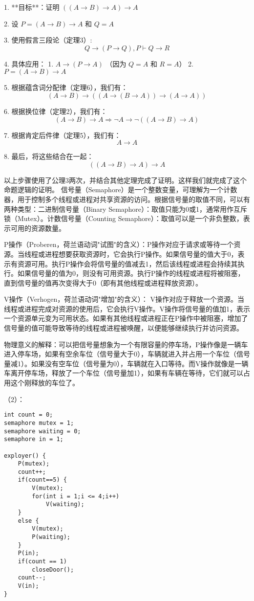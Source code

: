 \documentclass{article}
\begin{document}
1. **目标**：证明 \(((A \to B) \to A) \to A\)

2. 设 \(P = (A \to B) \to A\) 和 \(Q = A\)

3. 使用假言三段论（定理3）:
\[
Q \to (P \to Q), P \vdash Q \to R
\]

4. 具体应用：
1. \(A \to (P \to A)\) （因为 \(Q = A\) 和 \(R = A\)）
2. \(P = (A \to B) \to A\)

5. 根据蕴含词分配律（定理6），我们有：
\[
(A \to B) \to ((A \to (B \to A)) \to (A \to A))
\]

6. 根据换位律（定理2），我们有：
\[
(A \to B) \to A \Rightarrow \neg A \to \neg ((A \to B) \to A)
\]

7. 根据肯定后件律（定理5），我们有：
\[
A \to A
\]

8. 最后，将这些结合在一起：
\[
((A \to B) \to A) \to A
\]

以上步骤使用了公理3两次，并结合其他定理完成了证明。这样我们就完成了这个命题逻辑的证明。
信号量（Semaphore）是一个整数变量，可理解为一个计数器，用于控制多个线程或进程对共享资源的访问。根据信号量的取值不同，可以有两种类型：二进制信号量（Binary Semaphore）：取值只能为0或1，通常用作互斥锁（Mutex）。计数信号量（Counting Semaphore）：取值可以是一个非负整数，表示可用的资源数量。

P操作（Proberen，荷兰语动词"试图"的含义）：P操作对应于请求或等待一个资源。当线程或进程想要获取资源时，它会执行P操作。如果信号量的值大于0，表示有资源可用。执行P操作会将信号量的值减去1，然后该线程或进程会持续其执行。如果信号量的值为0，则没有可用资源。执行P操作的线程或进程将被阻塞，直到信号量的值再次变得大于0（即有其他线程或进程释放资源）。

V操作（Verhogen，荷兰语动词"增加"的含义）：
V操作对应于释放一个资源。当线程或进程完成对资源的使用后，它会执行V操作。V操作将信号量的值加1，表示一个资源单元变为可用状态。如果有其他线程或进程正在P操作中被阻塞，增加了信号量的值可能导致等待的线程或进程被唤醒，以便能够继续执行并访问资源。

物理意义的解释：可以把信号量想象为一个有限容量的停车场，P操作像是一辆车进入停车场，如果有空余车位（信号量大于0），车辆就进入并占用一个车位（信号量减1）。如果没有空车位（信号量为0），车辆就在入口等待。而V操作就像是一辆车离开停车场，释放了一个车位（信号量加1），如果有车辆在等待，它们就可以占用这个刚释放的车位了。

{\large （$2$）：}
\lstset{language=C}
\begin{lstlisting}
int count = 0;
semaphore mutex = 1;
semaphore waiting = 0;
semaphore in = 1;

exployer() {
	P(mutex);
	count++;
	if(count==5) {
		V(mutex);
		for(int i = 1;i <= 4;i++)
			V(waiting);
	}
	else {
		V(mutex);
		P(waiting);
	}
	P(in);
	if(count == 1)
		closeDoor();
	count--;
	V(in);
}
\end{lstlisting}
	
\end{document}
